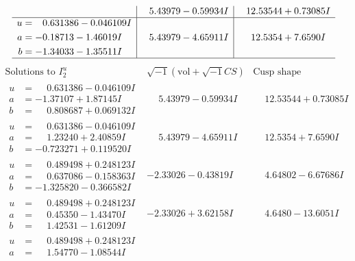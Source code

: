 \documentclass[1p]{elsarticle_modified}
\theoremstyle{definition}
\newcommand{\I}{\sqrt{-1}}
\begin{document}
$$\begin{array}{c|c|c}
 & \phantom{-}5.43979 - 0.59934 I & \phantom{-}12.53544 + 0.73085 I \\ \hline\begin{aligned}
u &= \phantom{-}0.631386 - 0.046109 I \\
a &= -0.18713 - 1.46019 I \\
b &= -1.34033 - 1.35511 I\end{aligned}
 & \phantom{-}5.43979 - 4.65911 I & \phantom{-}12.5354 + 7.6590 I\\
 \hline 
 \end{array}$$\newpage$$\begin{array}{c|c|c}  
\text{Solutions to }I^u_{2}& \I (\text{vol} + \sqrt{-1}CS) & \text{Cusp shape}\\
 \hline 
\begin{aligned}
u &= \phantom{-}0.631386 - 0.046109 I \\
a &= -1.37107 + 1.87145 I \\
b &= \phantom{-}0.808687 + 0.069132 I\end{aligned}
 & \phantom{-}5.43979 - 0.59934 I & \phantom{-}12.53544 + 0.73085 I \\ \hline\begin{aligned}
u &= \phantom{-}0.631386 - 0.046109 I \\
a &= \phantom{-}1.23240 + 2.40859 I \\
b &= -0.723271 + 0.119520 I\end{aligned}
 & \phantom{-}5.43979 - 4.65911 I & \phantom{-}12.5354 + 7.6590 I \\ \hline\begin{aligned}
u &= \phantom{-}0.489498 + 0.248123 I \\
a &= \phantom{-}0.637086 - 0.158363 I \\
b &= -1.325820 - 0.366582 I\end{aligned}
 & -2.33026 - 0.43819 I & \phantom{-}4.64802 - 6.67686 I \\ \hline\begin{aligned}
u &= \phantom{-}0.489498 + 0.248123 I \\
a &= \phantom{-}0.45350 - 1.43470 I \\
b &= \phantom{-}1.42531 - 1.61209 I\end{aligned}
 & -2.33026 + 3.62158 I & \phantom{-}4.6480 - 13.6051 I \\ \hline\begin{aligned}
u &= \phantom{-}0.489498 + 0.248123 I \\
a &= \phantom{-}1.54770 - 1.08544 I \\

\end{aligned}
\end{array}$$
\end{document}
